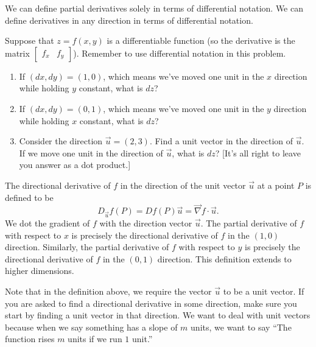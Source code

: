 We can define partial derivatives solely in terms of differential notation. We can define derivatives in any direction in terms of differential notation.

\begin{problem}
Suppose that $z=f(x,y)$ is a differentiable function (so the derivative is the matrix $\begin{bmatrix}f_x&f_y\end{bmatrix}$).  Remember to use differential notation in this problem.
\begin{enumerate}
 \item If $(dx,dy)=(1,0)$, which means we've moved one unit in the $x$ direction while holding $y$ constant, what is $dz$?
 \item If $(dx,dy)=(0,1)$, which means we've moved one unit in the $y$ direction while holding $x$ constant, what is $dz$?
 \item Consider the direction $\vec u=(2,3)$.  Find a unit vector in the direction of $\vec u$.  If we move one unit in the direction of $\vec u$, what is $dz$? [It's all right to leave you answer as a dot product.]    
\end{enumerate}
 
\end{problem}

\begin{definition}
The directional derivative of $f$ in the direction of the unit vector $\vec u$ at a point $P$ is defined to be
$$D_{\vec u} f(P) = Df(P) \vec u = \vec \nabla f \cdot \vec u.$$
We dot the gradient of $f$ with the direction vector $\vec u$.
The partial derivative of $f$ with respect to $x$ is precisely the directional derivative of $f$ in the $(1,0)$ direction.  Similarly,  
the partial derivative of $f$ with respect to $y$ is precisely the directional derivative of $f$ in the $(0,1)$ direction. 
This definition extends to higher dimensions.
\end{definition}

Note that in the definition above, we require the vector $\vec u$ to be a unit vector.  If you are asked to find a directional derivative in some direction, make sure you start by finding a unit vector in that direction. We want to deal with unit vectors because when we say something has a slope of $m$ units, we want to say ``The function rises $m$ units if we run $1$ unit.''  

